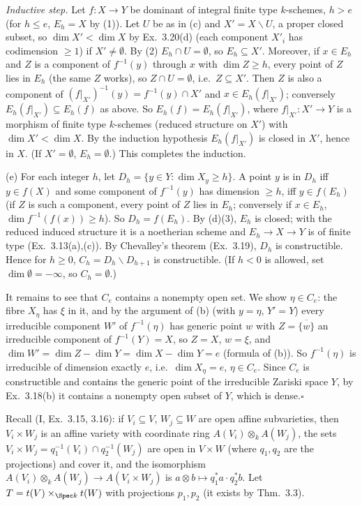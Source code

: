 \documentclass[11pt]{article}
\begin{document}
\emph{Inductive step.} Let $f:X\to Y$ be dominant of integral finite type $k$-schemes, $h>e$ (for $h\le e$, $E_h=X$ by (1)). Let $U$ be as in (c) and $X'=X\smallsetminus U$, a proper closed subset, so $\dim X'<\dim X$ by Ex.~3.20(d) (each component $X'_i$ has codimension $\ge1$) if $X'\neq\emptyset$. By (2) $E_h\cap U=\emptyset$, so $E_h\subseteq X'$. Moreover, if $x\in E_h$ and $Z$ is a component of $f^{-1}(y)$ through $x$ with $\dim Z\ge h$, every point of $Z$ lies in $E_h$ (the same $Z$ works), so $Z\cap U=\emptyset$, i.e.\ $Z\subseteq X'$. Then $Z$ is also a component of $(f|_{X'})^{-1}(y)=f^{-1}(y)\cap X'$ and $x\in E_h(f|_{X'})$; conversely $E_h(f|_{X'})\subseteq E_h(f)$ as above. So $E_h(f)=E_h(f|_{X'})$, where $f|_{X'}:X'\to Y$ is a morphism of finite type $k$-schemes (reduced structure on $X'$) with $\dim X'<\dim X$. By the induction hypothesis $E_h(f|_{X'})$ is closed in $X'$, hence in $X$. (If $X'=\emptyset$, $E_h=\emptyset$.) This completes the induction.

(e) For each integer $h$, let $D_h=\{y\in Y:\dim X_y\ge h\}$. A point $y$ is in $D_h$ iff $y\in f(X)$ and some component of $f^{-1}(y)$ has dimension $\ge h$, iff $y\in f(E_h)$ (if $Z$ is such a component, every point of $Z$ lies in $E_h$; conversely if $x\in E_h$, $\dim f^{-1}(f(x))\ge h$). So $D_h=f(E_h)$. By (d)(3), $E_h$ is closed; with the reduced induced structure it is a noetherian scheme and $E_h\to X\to Y$ is of finite type (Ex.~3.13(a),(c)). By Chevalley's theorem (Ex.~3.19), $D_h$ is constructible. Hence for $h\ge0$, $C_h=D_h\smallsetminus D_{h+1}$ is constructible. (If $h<0$ is allowed, set $\dim\emptyset=-\infty$, so $C_h=\emptyset$.)

It remains to see that $C_e$ contains a nonempty open set. We show $\eta\in C_e$: the fibre $X_\eta$ has $\xi$ in it, and by the argument of (b) (with $y=\eta$, $Y'=Y$) every irreducible component $W'$ of $f^{-1}(\eta)$ has generic point $w$ with $Z=\overline{\{w\}}$ an irreducible component of $f^{-1}(Y)=X$, so $Z=X$, $w=\xi$, and $\dim W'=\dim Z-\dim Y=\dim X-\dim Y=e$ (formula of (b)). So $f^{-1}(\eta)$ is irreducible of dimension exactly $e$, i.e.\ $\dim X_\eta=e$, $\eta\in C_e$. Since $C_e$ is constructible and contains the generic point of the irreducible Zariski space $Y$, by Ex.~3.18(b) it contains a nonempty open subset of $Y$, which is dense.\hfill$\square$

\pf
Recall (I, Ex.~3.15, 3.16): if $V_i\subseteq V$, $W_j\subseteq W$ are open affine subvarieties, then $V_i\times W_j$ is an affine variety with coordinate ring $A(V_i)\otimes_kA(W_j)$, the sets $V_i\times W_j=q_1^{-1}(V_i)\cap q_2^{-1}(W_j)$ are open in $V\times W$ (where $q_1,q_2$ are the projections) and cover it, and the isomorphism $A(V_i)\otimes_kA(W_j)\to A(V_i\times W_j)$ is $a\otimes b\mapsto q_1^*a\cdot q_2^*b$. Let $T=t(V)\times_{\Spec k}t(W)$ with projections $p_1,p_2$ (it exists by Thm.~3.3).
\end{document}
